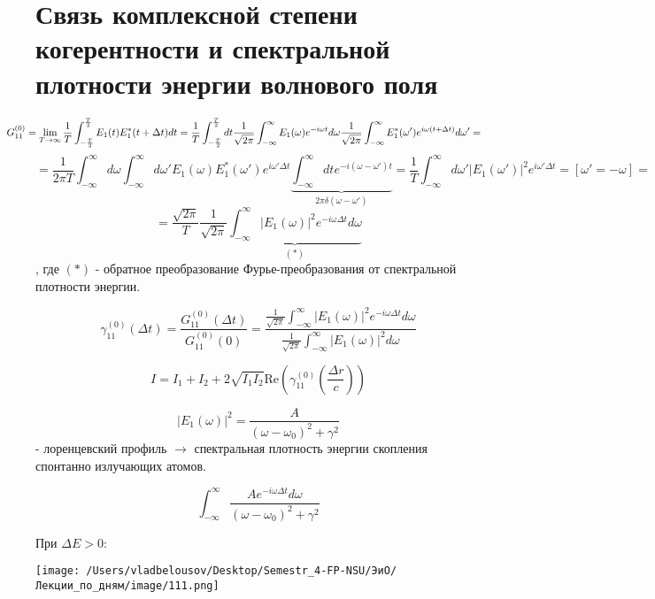 \documentclass[12pt, a4paper]{report}
\begin{document}
\fi


\section{Связь комплексной степени когерентности и спектральной плотности энергии волнового поля} 

\[\kern-1cm G_{11}^{(0)} = \lim_{T  \to \infty} \frac{1}{T }  \int_{-\frac{T}{2 } }^{\frac{T}{2 }  } E_1(t ) E_1 ^{* }  (t +\Delta t ) dt = \frac{1}{T }  \int_{-\frac{T}{2 } }^{\frac{T}{2 } } dt \frac{1}{\sqrt{2 \pi } } \int_{-\infty}^{\infty} E_1 (\omega ) e^{ - i \omega t } d \omega    \frac{1}{\sqrt{2 \pi } } \int_{-\infty}^{\infty} E_1 ^{* }  (\omega ' ) e^{i \omega (t + \Delta t )} d \omega ' =        \] 
\[ = \frac{1}{2 \pi T } \int_{-\infty}^{\infty}   d \omega \int_{-\infty}^{\infty}  d \omega ' E_1 ( \omega ) E_1 ^{* }  (\omega ' ) e^{i \omega ' \Delta t }\underbrace{ \int_{-\infty}^{\infty} dt e^{- i (\omega - \omega'  )t}}_{2 \pi \delta (\omega - \omega')} = \frac{1}{T }  \int_{-\infty}^{\infty} d \omega' |E_1 (\omega' )| ^2 e^{ i \omega ' \Delta t } = \left[ \omega' = -\omega \right]    = \] 
\[  =\frac{\sqrt{2 \pi } } {T } \frac{1}{\sqrt{2 \pi } } \underbrace{\int_{-\infty}^{\infty} |E_1(\omega )| ^2 e^{ - i \omega \Delta t } d \omega}_{(*)}   \] 
, где \( (*) \)  - обратное преобразование Фурье-преобразования от спектральной плотности энергии.

\[ \gamma_{11}^{(0 )}   (\Delta t ) = \frac{ G_{11} ^{(0 )} (\Delta t )}{G_{11}^{(0 )}  (0 )}= \frac{\displaystyle  \frac{1}{\sqrt{ 2 \pi } } \int_{-\infty}^{\infty} |E_1 (\omega )| ^2 e^{ - i \omega \Delta t }d \omega  }{\displaystyle  \frac{1}{ \sqrt{2 \pi }} \int_{-\infty}^{\infty} |E_1 (\omega )| ^2 d \omega }   \] 

\[ I = I_1 + I_2 + 2 \sqrt{I_1 I_2 } \mathrm{Re }  \left( \gamma_{11} ^{ (0 )} \left( \frac{\Delta r }{c}  \right) \right)   \] 

\[ |E_1 (\omega)| ^2 = \frac{A}{(\omega - \omega_0 ) ^2 + \gamma ^2 }   \]
- лоренцевский профиль \( \to  \) спектральная плотность энергии скопления спонтанно излучающих атомов. 

\[ \int_{-\infty}^{\infty} \frac{A e^{ - i \omega \Delta t }d \omega         }{(\omega - \omega_0 ) ^2 + \gamma ^2 }  \] 

При \( \Delta E > 0: \) 

\begin{center}
    \texttt{[image: /Users/vladbelousov/Desktop/Semestr\_4-FP-NSU/ЭиО/Лекции\_по\_дням/image/111.png]}
\end{center}
\end{document}
